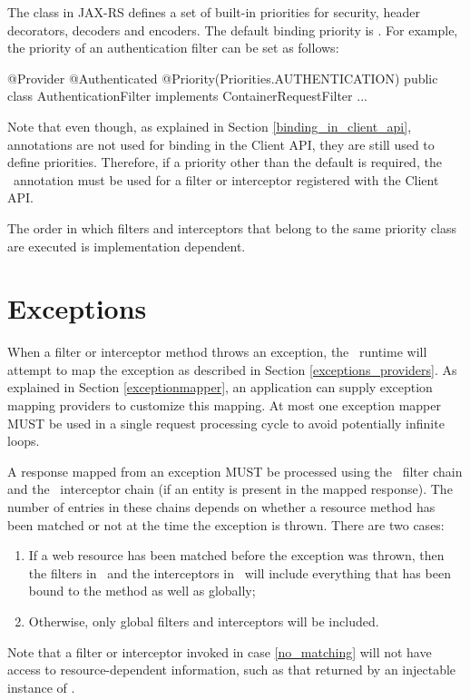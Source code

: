 The  class in JAX-RS defines a set of built-in priorities for security, header decorators, decoders and encoders. The default binding priority is . For example, the priority of an authentication filter can be set as follows:

\begin{listing}{1}
@Provider
@Authenticated
@Priority(Priorities.AUTHENTICATION)
public class AuthenticationFilter implements ContainerRequestFilter {
    ...
}
\end{listing}

Note that even though, as explained in Section \ref{binding_in_client_api}, annotations are not used for binding in the Client API, they are still used to define priorities. Therefore, if a priority other than the default is required, the \Priority\ annotation must be used for a filter or interceptor registered with the Client API. 

The order in which filters and interceptors that belong to the same priority class are executed is implementation dependent.

\section{Exceptions}
\label{exceptions_filters_and_interceptors}

When a filter or interceptor method throws an exception, the \jaxrs\ runtime will attempt to map the exception as described in Section \ref{exceptions_providers}.  As explained in Section \ref{exceptionmapper}, an application can supply exception mapping providers to customize this mapping. At most one exception mapper MUST be used in a single request processing cycle to avoid potentially infinite loops. 

A response mapped from an exception MUST be processed using the \ContainerResponse\ filter chain and the \WriteTo\ interceptor chain (if an entity is present in the mapped response). The number of entries in these chains depends on whether a resource method has been matched or not at the time the exception is thrown. There are two cases:

\begin{enumerate}
\item If a web resource has been matched before the exception was thrown, then the filters in \ContainerResponse\ and the interceptors in \WriteTo\ will include everything that has been bound to the method as well as globally;
\item\label{no_matching} Otherwise, only global filters and interceptors will be included.
\end{enumerate}

Note that a filter or interceptor invoked in case \ref{no_matching} will not have access to resource-dependent information, such as that returned by an injectable instance of .
